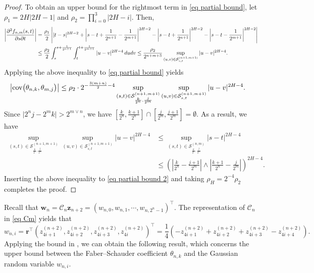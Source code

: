 \documentclass[12pt,reqno]{article}
\newcommand\scalemath[2]{\scalebox{#1}{\mbox{\ensuremath{\displaystyle #2}}}}
\numberwithin{equation}{section}
\def\cov{\mbox{cov}}
\def\var{\mbox{var}}
\theoremstyle{definition}
\def\cov{\hbox{\rm cov}}\def\var{\text{\rm Var}}
\newcommand{\calS}{\mathcal{S}}
\begin{document}
\begin{proof}
	
	To obtain an upper bound for the rightmost term in \eqref{eq partial bound}, let $\rho_1 = 2H|2H-1|$ and $\rho_2 = \prod_{i = 0}^{3}|2H-i|$. Then,	\begin{equation*}
		\scalemath{0.95}{
			\begin{split}
				\left|\frac{\partial^2 f_{n,m}(s,t)}{\partial s \partial t}\right| &= \frac{\rho_1}{2}\left||t-s|^{2H-2} + \left|s-t+\frac{1}{2^{n+1}}-\frac{1}{2^{m+1}}\right|^{2H-2} - \left|s-t+\frac{1}{2^{n+1}}\right|^{2H-2}-\left|s-t-\frac{1}{2^{m+1}}\right|^{2H-2}\right|\\
				&\le\frac{\rho_2}{2}\int_{s}^{s+\frac{1}{2^{n+1}}}\int_{t}^{t+\frac{1}{2^{m+1}}}|u-v|^{2H-4}\,dudv  \le \frac{\rho_2}{2^{n+m+3}}\sup_{(u,v) \in \calS^{(n+1,m+1)}_{s,t}}|u - v|^{2H - 4}.
		\end{split}}
	\end{equation*}
	Applying the above inequality to \eqref{eq partial bound} yields 
	\begin{equation}\label{eq partial bound 2}
		\begin{split}
			\big|\cov\big(\theta_{n,k},\theta_{m,j}\big)\big| &\le \rho_2\cdot 2^{-\frac{3(m+n)}{2}-4}\sup_{(s,t) \in \calS^{(n+1,m+1)}_{\frac{k}{2^n},\frac{j}{2^m}}} \sup_{(u,v) \in \calS^{(n+1,m+1)}_{s,t}}|u - v|^{2H - 4}.
		\end{split}
	\end{equation}
	Since $\big|2^n j - 2^m k\big| > 2^{m \vee n}$, we have $\left[\frac{k}{2^n},\frac{k+1}{2^n}\right] \cap \left[\frac{j}{2^m},\frac{j+1}{2^m}\right] = \emptyset$. As a result, we have 
	\begin{equation*}
		\begin{split}
			\sup_{(s,t)\in \calS^{(n+1,m+1)}_{\frac{k}{2^n},\frac{j}{2^m}}} \sup_{(u,v) \in \calS^{(n+1,m+1)}_{s,t}}|u - v|^{2H - 4} &\le \sup_{(s,t)\in \calS^{(n,m)}_{\frac{k}{2^n},\frac{j}{2^m}}}|s - t|^{2H - 4} \\&\le \left(\left|\frac{k}{2^n} - \frac{j+1}{2^m}\right| \wedge \left|\frac{k+1}{2^n} - \frac{j}{2^m}\right|\right)^{2H-4}.
		\end{split}
	\end{equation*}
	Inserting the above inequality to \eqref{eq partial bound 2} and taking $\rho_H= 2^{-4}\rho_2$ completes the proof. 
\end{proof}
Recall that $\bm w_n = \mathscr{C}_n \bm z_{n+2} = \left(w_{n,0},w_{n,1},\cdots,w_{n,2^n-1}\right)^\top$. The representation of $\mathscr{C}_n $ in \eqref{eq Cm} yields that 
\begin{equation}\label{eq w ni}
	w_{n,i} = \bm r^\top \left(z^{(n+2)}_{4i+1},z^{(n+2)}_{4i+2},z^{(n+2)}_{4i+3},z^{(n+2)}_{4i}\right)^\top = \frac{1}{4}\left(-z^{(n+2)}_{4i+1}+z^{(n+2)}_{4i+2}+z^{(n+2)}_{4i+3}-z^{(n+2)}_{4i+4}\right).
\end{equation}
Applying the bound in , we can obtain the following result, which concerns the upper bound between the Faber--Schauder coefficient $\theta_{n,k}$ and the Gaussian random variable $w_{n,i}$.
\end{document}
